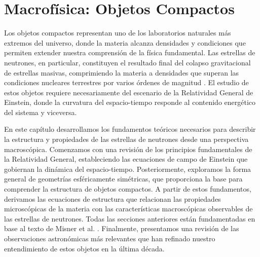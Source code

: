 









\chapter{Macrofísica: Objetos Compactos}

Los objetos compactos representan uno de los laboratorios naturales más extremos del universo, donde la materia alcanza densidades y condiciones que permiten extender nuestra comprensión de la física fundamental. Las estrellas de neutrones, en particular, constituyen el resultado final del colapso gravitacional de estrellas masivas, comprimiendo la materia a densidades que superan las condiciones nucleares terrestres por varios órdenes de magnitud \cite{baadeSuperNovae1934}. El estudio de estos objetos requiere necesariamente del escenario de la Relatividad General de Einstein, donde la curvatura del espacio-tiempo responde al contenido energético del sistema y viceversa.

En este capítulo desarrollamos los fundamentos teóricos necesarios para describir la estructura y propiedades de las estrellas de neutrones desde una perspectiva macroscópica. Comenzamos con una revisión de los principios fundamentales de la Relatividad General, estableciendo las ecuaciones de campo de Einstein que gobiernan la dinámica del espacio-tiempo. Posteriormente, exploramos la forma general de geometrías esféricamente simétricas, que proporciona la base para comprender la estructura de objetos compactos. A partir de estos fundamentos, derivamos las ecuaciones de estructura que relacionan las propiedades microscópicas de la materia con las características macroscópicas observables de las estrellas de neutrones. Todas las secciones anteriores están fundamentadas en base al texto de Misner et al. \cite{misnerGravitation2017}. Finalmente, presentamos una revisión de las observaciones astronómicas más relevantes que han refinado nuestro entendimiento de estos objetos en la última década.

